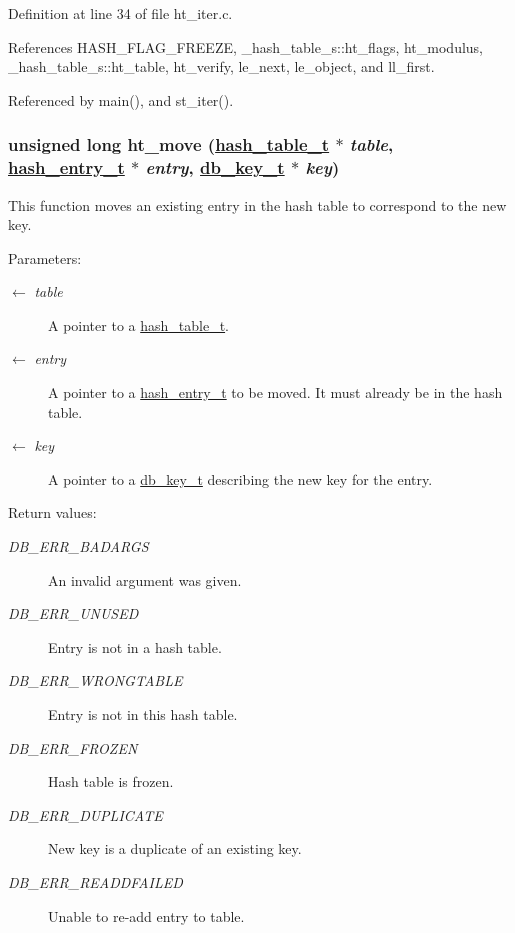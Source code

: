 Definition at line 34 of file ht\_\-iter.c.

References HASH\_\-FLAG\_\-FREEZE, \_\-hash\_\-table\_\-s::ht\_\-flags, ht\_\-modulus, \_\-hash\_\-table\_\-s::ht\_\-table, ht\_\-verify, le\_\-next, le\_\-object, and ll\_\-first.

Referenced by main(), and st\_\-iter().\hypertarget{group__dbprim__hash_ga11}{
\subsubsection[ht\_\-move]{\setlength{\rightskip}{0pt plus 5cm}unsigned long ht\_\-move (\hyperlink{struct__hash__table__s}{hash\_\-table\_\-t} $\ast$ {\em table}, \hyperlink{struct__hash__entry__s}{hash\_\-entry\_\-t} $\ast$ {\em entry}, \hyperlink{struct__db__key__s}{db\_\-key\_\-t} $\ast$ {\em key})}}
\label{group__dbprim__hash_ga11}


This function moves an existing entry in the hash table to correspond to the new key.

\begin{Desc}
\item[Parameters:]
\begin{description}
\item[\mbox{$\leftarrow$} {\em table}]A pointer to a \hyperlink{group__dbprim__hash_ga1}{hash\_\-table\_\-t}. \item[\mbox{$\leftarrow$} {\em entry}]A pointer to a \hyperlink{group__dbprim__hash_ga2}{hash\_\-entry\_\-t} to be moved. It must already be in the hash table. \item[\mbox{$\leftarrow$} {\em key}]A pointer to a \hyperlink{group__dbprim_ga0}{db\_\-key\_\-t} describing the new key for the entry.\end{description}
\end{Desc}
\begin{Desc}
\item[Return values:]
\begin{description}
\item[{\em DB\_\-ERR\_\-BADARGS}]An invalid argument was given. \item[{\em DB\_\-ERR\_\-UNUSED}]Entry is not in a hash table. \item[{\em DB\_\-ERR\_\-WRONGTABLE}]Entry is not in this hash table. \item[{\em DB\_\-ERR\_\-FROZEN}]Hash table is frozen. \item[{\em DB\_\-ERR\_\-DUPLICATE}]New key is a duplicate of an existing key. \item[{\em DB\_\-ERR\_\-READDFAILED}]Unable to re-add entry to table.\end{description}
\end{Desc}


